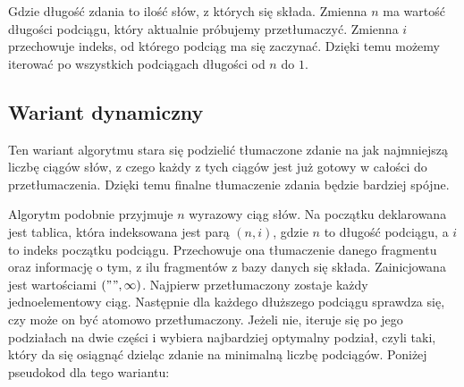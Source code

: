 Gdzie długość zdania to ilość słów, z których się składa. Zmienna $n$ ma wartość długości podciągu, który aktualnie próbujemy przetłumaczyć. Zmienna $i$ przechowuje indeks, od którego podciąg ma się zaczynać. Dzięki temu możemy iterować po wszystkich podciągach długości od $n$ do $1$.

\subsection{Wariant dynamiczny}
Ten wariant algorytmu stara się podzielić tłumaczone zdanie na jak najmniejszą liczbę ciągów słów, z czego każdy z tych ciągów jest już gotowy w całości do przetłumaczenia. Dzięki temu finalne tłumaczenie zdania będzie bardziej spójne.

Algorytm podobnie przyjmuje $n$ wyrazowy ciąg słów. Na początku deklarowana jest tablica, która indeksowana jest parą $(n,i)$, gdzie $n$ to długość podciągu, a $i$ to indeks początku podciągu. Przechowuje ona tłumaczenie danego fragmentu oraz informację o tym, z ilu fragmentów z bazy danych się składa. Zainicjowana jest wartościami $( "", \infty)$. Najpierw przetłumaczony zostaje każdy jednoelementowy ciąg. Następnie dla każdego dłuższego podciągu sprawdza się, czy może on być atomowo przetłumaczony. Jeżeli nie, iteruje się po jego podziałach na dwie części i wybiera najbardziej optymalny podział, czyli taki, który da się osiągnąć dzieląc zdanie na minimalną liczbę podciągów. Poniżej pseudokod dla tego wariantu:

